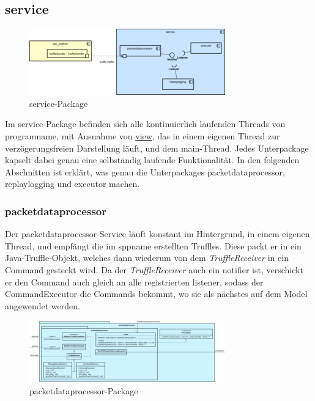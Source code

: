\subsection{service}
\label{subsec:service}

\begin{figure}[H]
  \centering
  \includegraphics[width=\textwidth]{../diagramimages/service.png}
  \caption{service-Package}
\end{figure}

\medskip
Im service-Package befinden sich alle kontinuierlich laufenden Threads von \gls{programname},
mit Ausnahme von \hyperref[subsec:view]{view}, das in einem eigenen Thread zur verzögerungsfreien Darstellung läuft, und dem
main-Thread. Jedes Unterpackage kapselt dabei genau eine selbständig laufende Funktionalität. In den folgenden Abschnitten ist erklärt, was genau die Unterpackages packetdataprocessor, replaylogging und executor machen.

    \subsubsection{packetdataprocessor}
    \label{subsubsec:truffleprocessor}

    Der packetdataprocessor-Service läuft konstant im Hintergrund, in einem eigenen Thread,
    und empfängt die im \gls{sppname} erstellten Truffles.
    Diese packt er in ein Java-Truffle-Objekt, welches dann wiederum von dem
    \textit{TruffleReceiver} in ein Command gesteckt wird. Da der \textit{TruffleReceiver}
    auch ein \gls{notifier} ist, verschickt er den Command auch gleich an
    alle registrierten \gls{listener}, sodass der CommandExecutor die Commands bekommt, wo sie
    als nächstes auf dem Model angewendet werden.

    \clearpage
    \begin{figure}
      \centering
      \includegraphics[width=\textwidth]{../diagramimages/packetdataprocessor.png}
      \caption{packetdataprocessor-Package}
    \end{figure}
    \clearpage

